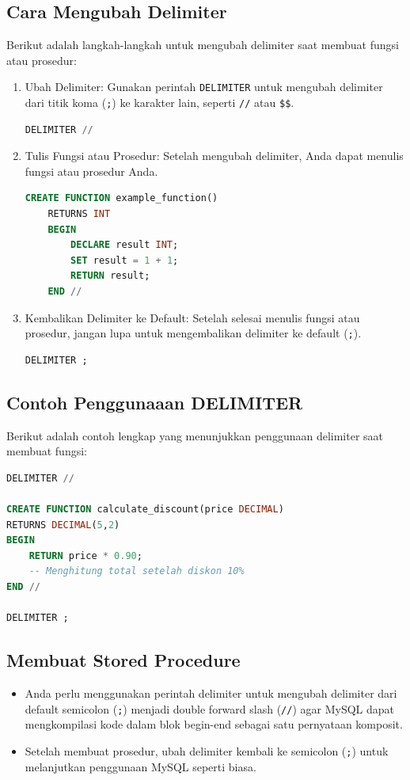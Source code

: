 \documentclass{article}
\begin{document}
\subsection{Cara Mengubah Delimiter}
Berikut adalah langkah-langkah untuk mengubah delimiter saat membuat fungsi atau prosedur:
\begin{enumerate}
    \item Ubah Delimiter: Gunakan perintah \verb|DELIMITER| untuk mengubah delimiter dari titik koma (\verb|;|) ke karakter lain, seperti \verb|//| atau \verb|$$|.
          \begin{lstlisting}[language=SQL, caption={}, captionpos=b]
DELIMITER //
\end{lstlisting}
    \item Tulis Fungsi atau Prosedur: Setelah mengubah delimiter, Anda dapat menulis fungsi atau prosedur Anda.
          \begin{lstlisting}[language=SQL, caption={}, captionpos=b]
CREATE FUNCTION example_function()
    RETURNS INT
    BEGIN
        DECLARE result INT;
        SET result = 1 + 1;
        RETURN result;
    END //
\end{lstlisting}
    \item Kembalikan Delimiter ke Default: Setelah selesai menulis fungsi atau prosedur, jangan lupa untuk mengembalikan delimiter ke default (\verb|;|).
          \begin{lstlisting}[language=SQL, caption={}, captionpos=b]
DELIMITER ;
\end{lstlisting}
\end{enumerate}

\subsection{Contoh Penggunaaan DELIMITER}
Berikut adalah contoh lengkap yang menunjukkan penggunaan delimiter saat membuat fungsi:
\begin{lstlisting}[language=SQL, caption={}, captionpos=b]
DELIMITER //

CREATE FUNCTION calculate_discount(price DECIMAL)
RETURNS DECIMAL(5,2)
BEGIN
    RETURN price * 0.90; 
    -- Menghitung total setelah diskon 10%
END //

DELIMITER ;
\end{lstlisting}

\subsection{Membuat Stored Procedure}
\begin{itemize}
    \item Anda perlu menggunakan perintah delimiter untuk mengubah delimiter dari default semicolon (\verb|;|) menjadi double forward slash (\verb|//|) agar MySQL dapat mengkompilasi kode dalam blok begin-end sebagai satu pernyataan komposit.
    \item Setelah membuat prosedur, ubah delimiter kembali ke semicolon (\verb|;|) untuk melanjutkan penggunaan MySQL seperti biasa.
\end{itemize}
\end{document}
